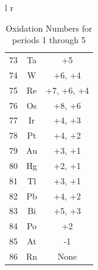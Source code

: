 \begin{table}[ht]
\begin{tabular}{l r}
\begin{tabular}{c c c}
            73 & Ta & +5 \\
            74 & W & +6, +4 \\
            75 & Re & +7, +6, +4 \\
            76 & Os & +8, +6 \\
            77 & Ir & +4, +3 \\
            78 & Pt & +4, +2 \\
            79 & Au & +3, +1 \\
            80 & Hg & +2, +1 \\
            81 & Tl & +3, +1 \\
            82 & Pb & +4, +2 \\
            83 & Bi & +5, +3 \\
            84 & Po & +2 \\
            85 & At & -1 \\
            86 & Rn & None \\
        \end{tabular}\\
    \end{tabular}
        \caption{Oxidation Numbers for periods 1 through 5}
        \label{table:OxidationNumbers}
\end{table}
